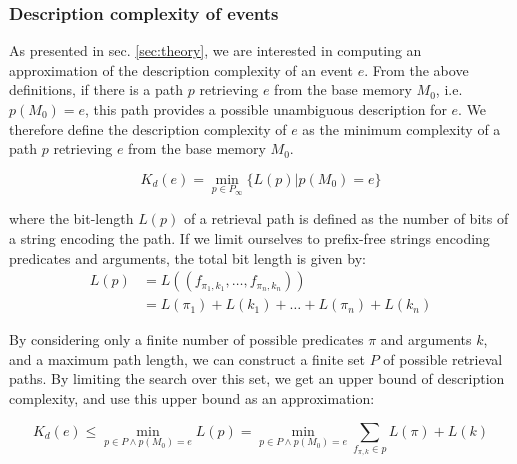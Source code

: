 \documentclass[entropy,article,submit,moreauthors,pdftex]{Definitions/mdpi}
\begin{document}
\subsubsection{Description complexity of events}

As presented in sec. \ref{sec:theory}, we are interested in computing an approximation of the description complexity of an event $e$. From the above definitions, if there is a path $p$ retrieving $e$ from the base memory $M_0$, i.e. $p(M_0) = e$, this path provides a possible unambiguous description for $e$. We therefore define the description complexity of $e$ as the minimum complexity of a path $p$ retrieving $e$ from the base memory $M_0$.

\begin{equation}
    \label{eq:k_desc}
    K_d(e) = \min_{p \in P_\infty} \{L(p) | p(M_0) = e\}
\end{equation}

where the bit-length $L(p)$ of a retrieval path is defined as the number of bits of a string encoding the path. If we limit ourselves to prefix-free strings encoding predicates and arguments, the total bit length is given by:
\begin{align}
    \label{eq:bit_lenght_p}
    L(p) & = L((f_{\pi_1,k_1}, \dots, f_{\pi_n, k_n}))     \\
         & = L(\pi_1) + L(k_1) + \dots + L(\pi_n) + L(k_n)
\end{align}


By considering only a finite number of possible predicates $\pi$ and arguments $k$, and a maximum path length, we can construct a finite set $P$ of possible retrieval paths. By limiting the search over this set, we get an upper bound of description complexity, and use this upper bound as an approximation:

\begin{equation}
    \label{eq:approx_k_desc}
    K_d(e) \leq \min_{p \in P \land p(M_0) = e} L(p) = \min_{p \in P \land p(M_0)=e} \sum_{f_{\pi, k} \in p} L(\pi) + L(k)
\end{equation}
\end{document}
